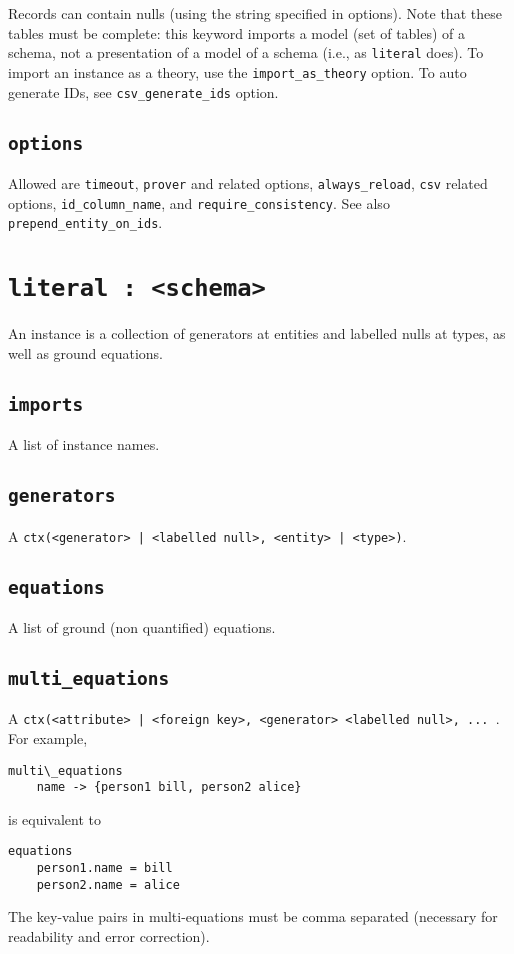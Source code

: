 \documentclass[10pt]{book}
\begin{document}
Records can contain nulls (using the string specified in options).  Note that these tables must be complete: this keyword imports a model (set of tables) of a schema, not a presentation of a model of a schema (i.e., as {\tt literal} does).  To import an instance as a theory, use the {\tt import\_as\_theory} option.  To auto generate IDs, see {\tt csv\_generate\_ids} option.

\subsection{{\tt options}}
Allowed are {\tt timeout}, {\tt prover} and related options, {\tt always\_reload}, {\tt csv} related options, {\tt id\_column\_name}, and {\tt require\_consistency}. 
 See also {\tt prepend\_entity\_on\_ids}.

\section{{\tt literal : <schema>}}

An instance is a collection of generators at entities and labelled nulls at types, as well as ground equations.

\subsection{{\tt imports}}
A list of instance names.

\subsection{{\tt generators}}
A {\tt ctx(<generator> | <labelled null>, <entity> | <type>)}.

\subsection{{\tt equations}}
A list of ground (non quantified) equations.

\subsection{{\tt multi\_equations}}
A {\tt ctx(<attribute> | <foreign key>, {<generator> <labelled null>, ... }}.  For example,
\begin{verbatim}
multi\_equations
	name -> {person1 bill, person2 alice}
\end{verbatim}
is equivalent to
\begin{verbatim}
equations
	person1.name = bill
	person2.name = alice
\end{verbatim}
The key-value pairs in multi-equations must be comma separated (necessary for readability and error correction).
\end{document}
